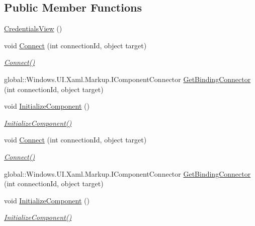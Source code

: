 \subsection*{Public Member Functions}
\begin{DoxyCompactItemize}
\item 
\hyperlink{class_eli_log_in_app_1_1_credentials_view_af687c41bf5a02c5092d2007a40402b77}{Credentials\+View} ()
\item 
void \hyperlink{class_eli_log_in_app_1_1_credentials_view_a0a2179d420f12bec24a13d3f35da3b8a}{Connect} (int connection\+Id, object target)
\begin{DoxyCompactList}\small\item\em \hyperlink{class_eli_log_in_app_1_1_credentials_view_a0a2179d420f12bec24a13d3f35da3b8a}{Connect()} \end{DoxyCompactList}\item 
global\+::\+Windows.\+U\+I.\+Xaml.\+Markup.\+I\+Component\+Connector \hyperlink{class_eli_log_in_app_1_1_credentials_view_a0811c4d1e956579661dc0d1fb64856e8}{Get\+Binding\+Connector} (int connection\+Id, object target)
\item 
void \hyperlink{class_eli_log_in_app_1_1_credentials_view_a8a76b925bb31dbb8edff4dade82d7e44}{Initialize\+Component} ()
\begin{DoxyCompactList}\small\item\em \hyperlink{class_eli_log_in_app_1_1_credentials_view_a8a76b925bb31dbb8edff4dade82d7e44}{Initialize\+Component()} \end{DoxyCompactList}\item 
void \hyperlink{class_eli_log_in_app_1_1_credentials_view_a0a2179d420f12bec24a13d3f35da3b8a}{Connect} (int connection\+Id, object target)
\begin{DoxyCompactList}\small\item\em \hyperlink{class_eli_log_in_app_1_1_credentials_view_a0a2179d420f12bec24a13d3f35da3b8a}{Connect()} \end{DoxyCompactList}\item 
global\+::\+Windows.\+U\+I.\+Xaml.\+Markup.\+I\+Component\+Connector \hyperlink{class_eli_log_in_app_1_1_credentials_view_a0811c4d1e956579661dc0d1fb64856e8}{Get\+Binding\+Connector} (int connection\+Id, object target)
\item 
void \hyperlink{class_eli_log_in_app_1_1_credentials_view_a8a76b925bb31dbb8edff4dade82d7e44}{Initialize\+Component} ()
\begin{DoxyCompactList}\small\item\em \hyperlink{class_eli_log_in_app_1_1_credentials_view_a8a76b925bb31dbb8edff4dade82d7e44}{Initialize\+Component()} \end{DoxyCompactList}\item 

\end{DoxyCompactItemize}
